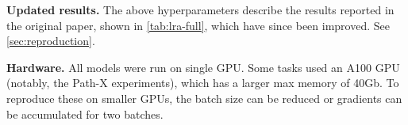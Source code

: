 \documentclass{article}
\begin{document}
\textbf{Updated results.}
The above hyperparameters describe the results reported in the original paper, shown in \cref{tab:lra-full}, which have since been improved.
See \cref{sec:reproduction}.

\textbf{Hardware.}
All models were run on single GPU.
Some tasks used an A100 GPU (notably, the Path-X experiments), which has a larger max memory of 40Gb.
To reproduce these on smaller GPUs, the batch size can be reduced or gradients can be accumulated for two batches.

\begin{table*}[!t]
  \caption{
    The values of the best hyperparameters found for classification datasets; LRA (Top) and images/speech (Bottom).
    LR is learning rate and WD is weight decay. BN and LN refer to Batch Normalization and Layer Normalization.
  }
  \label{tab::best-hyperparameters}
  \centering
\end{table*}
\end{document}
